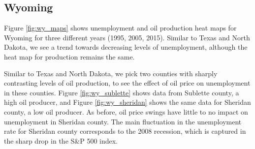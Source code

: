 \documentclass[11pt,letterpaper]{article}
\begin{document}
\subsection{Wyoming}

Figure \ref{fig:wy_maps} shows unemployment and oil production heat maps for Wyoming for three different years (1995, 2005, 2015). Similar to Texas and North Dakota, we see a trend towards decreasing levels of unemployment, although the heat map for production remains the same. 

Similar to Texas and North Dakota, we pick two counties with sharply contrasting levels of oil production, to see the effect of oil price on unemployment in these counties. Figure \ref{fig:wy_sublette} shows data from Sublette county, a high oil producer, and Figure \ref{fig:wy_sheridan} shows the same data for Sheridan county, a low oil producer. As before, oil price swings have little to no impact on unemployment in Sheridan county. The main fluctuation in the unemployment rate for Sheridan county corresponds to the 2008 recession, which is captured in the sharp drop in the S\&P 500 index.
\end{document}
